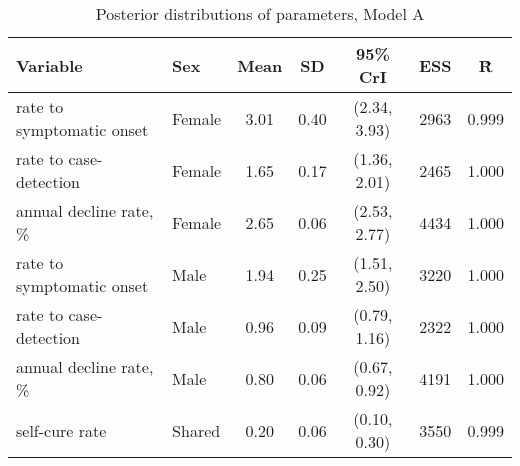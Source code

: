 \begin{table}[h]

\caption{\label{tab:}Posterior distributions of parameters, Model A}
\centering
\begin{tabular}[t]{llccccc}
\toprule
Variable & Sex & Mean & SD & 95\% CrI & ESS & \^{R}\\
\midrule
rate to symptomatic onset & Female & 3.01 & 0.40 & (2.34, 3.93) & 2963 & 0.999\\
rate to case-detection & Female & 1.65 & 0.17 & (1.36, 2.01) & 2465 & 1.000\\
annual decline rate, \% & Female & 2.65 & 0.06 & (2.53, 2.77) & 4434 & 1.000\\
\addlinespace
rate to symptomatic onset & Male & 1.94 & 0.25 & (1.51, 2.50) & 3220 & 1.000\\
rate to case-detection & Male & 0.96 & 0.09 & (0.79, 1.16) & 2322 & 1.000\\
annual decline rate, \% & Male & 0.80 & 0.06 & (0.67, 0.92) & 4191 & 1.000\\
\addlinespace
self-cure rate & Shared & 0.20 & 0.06 & (0.10, 0.30) & 3550 & 0.999\\
\bottomrule
\end{tabular}
\end{table}
